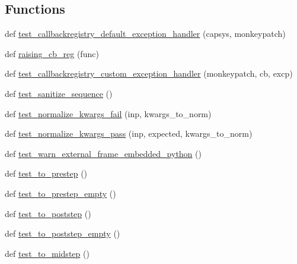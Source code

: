 \subsection*{Functions}
\begin{DoxyCompactItemize}
\item 
def \hyperlink{namespacematplotlib_1_1tests_1_1test__cbook_ab5e4fe59ebc056ff190e8603e66d42ac}{test\+\_\+callbackregistry\+\_\+default\+\_\+exception\+\_\+handler} (capsys, monkeypatch)
\item 
def \hyperlink{namespacematplotlib_1_1tests_1_1test__cbook_a239bd8e2d688fc67feafb42b909eb9ec}{raising\+\_\+cb\+\_\+reg} (func)
\item 
def \hyperlink{namespacematplotlib_1_1tests_1_1test__cbook_ad5c3982196c58596b9fb1056e0d9828b}{test\+\_\+callbackregistry\+\_\+custom\+\_\+exception\+\_\+handler} (monkeypatch, cb, excp)
\item 
def \hyperlink{namespacematplotlib_1_1tests_1_1test__cbook_a43da94b34bda5921538944fe42a3264f}{test\+\_\+sanitize\+\_\+sequence} ()
\item 
def \hyperlink{namespacematplotlib_1_1tests_1_1test__cbook_a93d4ab244d8ae33cbe8e141546939880}{test\+\_\+normalize\+\_\+kwargs\+\_\+fail} (inp, kwargs\+\_\+to\+\_\+norm)
\item 
def \hyperlink{namespacematplotlib_1_1tests_1_1test__cbook_a045d62d7e9438a7504e8a1538f3e6aed}{test\+\_\+normalize\+\_\+kwargs\+\_\+pass} (inp, expected, kwargs\+\_\+to\+\_\+norm)
\item 
def \hyperlink{namespacematplotlib_1_1tests_1_1test__cbook_ad04b4b94298bc9cf1a18fede245e383e}{test\+\_\+warn\+\_\+external\+\_\+frame\+\_\+embedded\+\_\+python} ()
\item 
def \hyperlink{namespacematplotlib_1_1tests_1_1test__cbook_a1498759845479a9ce416bb5e872fef1a}{test\+\_\+to\+\_\+prestep} ()
\item 
def \hyperlink{namespacematplotlib_1_1tests_1_1test__cbook_a3299c8112e140f8d2742a310a2fc3963}{test\+\_\+to\+\_\+prestep\+\_\+empty} ()
\item 
def \hyperlink{namespacematplotlib_1_1tests_1_1test__cbook_ace0651f6833e966d95b98856ab8a095a}{test\+\_\+to\+\_\+poststep} ()
\item 
def \hyperlink{namespacematplotlib_1_1tests_1_1test__cbook_a429febd3a78e861a8f7a95405e575173}{test\+\_\+to\+\_\+poststep\+\_\+empty} ()
\item 
def \hyperlink{namespacematplotlib_1_1tests_1_1test__cbook_afa918815be8173b276c14e2ac4bd8b83}{test\+\_\+to\+\_\+midstep} ()

\end{DoxyCompactItemize}
